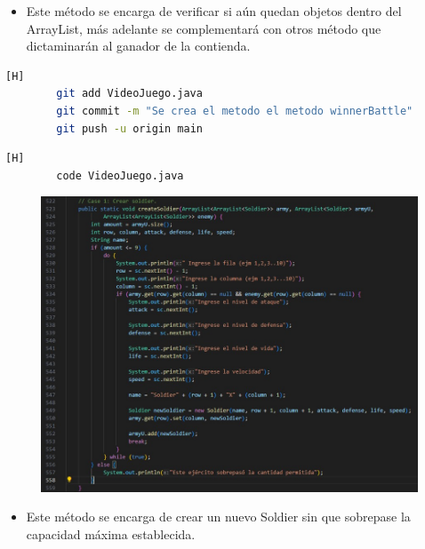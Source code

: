 \documentclass{article}
\begin{document}
	
	\begin{itemize}	
		\item Este método se encarga de verificar si aún quedan objetos dentro del ArrayList, más adelante se complementará con otros método que dictaminarán al ganador de la contienda.
	\end{itemize}
	
	\begin{lstlisting}[language=bash,caption={Commit: 04134f5051779fbd5b19cbea7b9a076d56d46d90}][H]
		git add VideoJuego.java
		git commit -m "Se crea el metodo el metodo winnerBattle"			
		git push -u origin main
	\end{lstlisting}
	
	
	\begin{lstlisting}[language=bash,caption={Se implementa el método para crear un Soldier }][H]
		code VideoJuego.java
	\end{lstlisting}
	
	\begin{figure}[H]
		\centering
		\includegraphics[width=1\textwidth,keepaspectratio]{img/createSoldier.jpg}
	\end{figure}
	
	
	\begin{itemize}	
		\item Este método se encarga de crear un nuevo Soldier sin que sobrepase la capacidad máxima establecida.
	\end{itemize}
	
\end{document}
